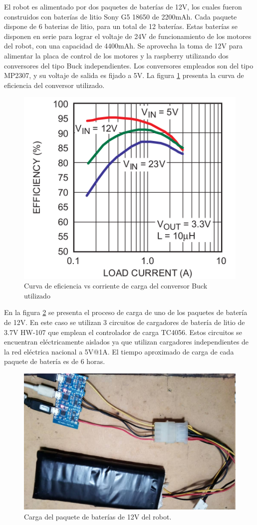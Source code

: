 El robot es alimentado por dos paquetes de baterías de 12V, los cuales fueron construidos con baterías de litio Sony G5 18650 de 2200mAh. Cada paquete dispone de 6 baterias de litio, para un total de 12 baterías.  Estas baterías se disponen en serie para lograr el voltaje de 24V de funcionamiento de los motores del robot, con una capacidad de 4400mAh. Se aprovecha la toma de 12V para alimentar la placa de control de los motores y la raspberry utilizando dos conversores del tipo Buck independientes. Los conversores empleados son del tipo MP2307, y su voltaje de salida es fijado a  5V.
La figura \ref{imagen:BuckCurva} presenta la curva de eficiencia del conversor utilizado.


\begin{figure}[H]
	\centering	
	\includegraphics[width=0.5\linewidth]{imagenes/prototipo/Buck}
	\caption{Curva de eficiencia vs corriente de carga del conversor Buck utilizado}
	\label{imagen:BuckCurva}
\end{figure}


En la figura \ref{imagen:Bateria} se presenta el proceso de carga de uno de los paquetes de batería de 12V. En este caso se utilizan 3 circuitos de cargadores de batería de litio de 3.7V HW-107 que emplean el controlador de carga TC4056. Estos circuitos se encuentran eléctricamente aislados ya que utilizan cargadores independientes de la red eléctrica nacional a 5V@1A. El tiempo aproximado de carga de cada paquete de batería es de 6 horas.

\begin{figure}[H]
	\centering	
	\includegraphics[width=0.7\linewidth]{imagenes/prototipo/Bateria}
	\caption{Carga del paquete de baterías de 12V del robot.}
	\label{imagen:Bateria}
\end{figure}

